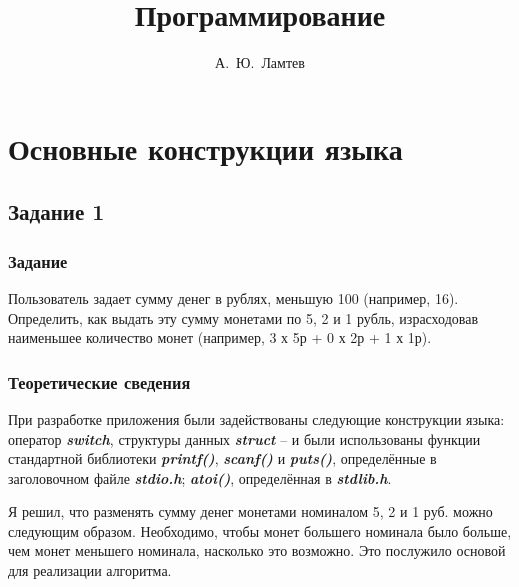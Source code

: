 \documentclass[12pt,a4paper]{report}
\author{А.~Ю.~Ламтев}
\title{Программирование}
\begin{document}
\maketitle
\chapter{Основные конструкции языка}
\section{Задание 1}
\subsection{Задание}
Пользователь задает сумму денег в рублях, меньшую 100 (например, 16). Определить, как выдать эту сумму монетами по 5, 2 и 1 рубль, израсходовав наименьшее количество монет (например, 3 х 5р + 0 х 2р + 1 х 1р).
\subsection{Теоретические сведения}

При разработке приложения были задействованы следующие конструкции языка: оператор \textbf{\textit{switch}}, структуры данных \textbf{\textit{struct}} -- и были использованы функции стандартной библиотеки \textbf{\textit{printf()}}, \textbf{\textit{scanf()}} и \textbf{\textit{puts()}}, определённые в заголовочном файле \textbf{\textit{stdio.h}}; \textbf{\textit{atoi()}}, определённая в \textbf{\textit{stdlib.h}}. 

Я решил, что разменять сумму денег монетами номиналом 5, 2 и 1 руб. можно следующим образом. Необходимо, чтобы монет большего номинала было больше, чем монет меньшего номинала, насколько это возможно. Это послужило основой для реализации алгоритма.
\end{document}
